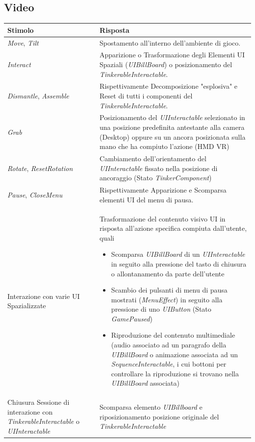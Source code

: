 \documentclass[10pt, openany]{article}
\begin{document}
    \subsection{Video}
    \begin{table}[h]
      \centering
      \begin{tabular}{@{} p{} p{} @{}}
        \toprule
        \textbf{Stimolo} & \textbf{Risposta} \\
        \midrule
        \textit{Move}, \textit{Tilt} & Spostamento all'interno dell'ambiente di gioco. \\
        \textit{Interact} & Apparizione o Trasformazione degli Elementi UI Spaziali (\textit{UIBillBoard}) o posizionamento del \textit{TinkerableInteractable}. \\
        \textit{Dismantle}, \textit{Assemble} & Rispettivamente Decomposizione "esplosiva" e Reset di tutti i componenti del \textit{TinkerableInteractable}. \\
        \textit{Grab} & Posizionamento del \textit{UIInteractable} selezionato in una posizione predefinita antestante alla camera (Desktop) oppure su un ancora posizionata sulla 
          mano che ha compiuto l'azione (HMD VR) \\
        \textit{Rotate}, \textit{ResetRotation} & Cambiamento dell'orientamento del \textit{UIInteractable} fissato nella posizione di ancoraggio (Stato \textit{TinkerComponent}) \\
        \textit{Pause}, \textit{CloseMenu} & Rispettivamente Apparizione e Scomparsa elementi UI del menu di pausa. \\
        Interazione con varie UI Spazializzate & Trasformazione del contenuto visivo UI in risposta all'azione specifica compiuta dall'utente, quali
          \begin{itemize}[noitemsep, topsep=0pt]
            \item Scomparsa \textit{UIBillBoard} di un \textit{UIInteractable} in seguito alla pressione del tasto di chiusura o allontanamento da parte dell'utente
            \item Scambio dei pulsanti di menu di pausa mostrati (\textit{MenuEffect}) in seguito alla pressione di uno \textit{UIButton} (Stato \textit{GamePaused})
            \item Riproduzione del contenuto multimediale (audio associato ad un paragrafo della \textit{UIBillBoard} o animazione associata ad un \textit{SequenceInteractable}, i cui 
              bottoni per controllare la riproduzione si trovano nella \textit{UIBillBoard} associata)
          \end{itemize} \\
        Chiusura Sessione di interazione con \textit{TinkerableInteractable} o \textit{UIInteractable} & Scomparsa elemento \textit{UIBillboard} e riposizionamento posizione originale
          del \textit{TinkerableInteractable} \\
        \bottomrule
      \end{tabular}
    \end{table}
    \FloatBarrier
    \needspace{0.3\paperheight}
\end{document}
